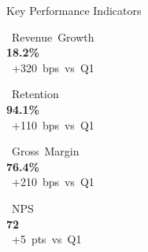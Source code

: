 \documentclass[11pt,aspectratio=169]{beamer}
\begin{document}
\begin{frame}{Key Performance Indicators}

  \vspace{0.15cm}

  \begin{minipage}[t]{0.235\textwidth}
    \begin{tcolorbox}[kpibox]
      \centering
      {\small\color{nxgray}\faDollarSign\ Revenue\ Growth}\\[0.2cm]
      {\fontsize{22}{28}\selectfont\bfseries\color{nxnavy}18.2\%}\\[0.05cm]
      {\tiny\color{nxteal}\faArrowUp\ +320\ bps\ vs\ Q1}
    \end{tcolorbox}
  \end{minipage}\hfill
  \begin{minipage}[t]{0.235\textwidth}
    \begin{tcolorbox}[kpibox]
      \centering
      {\small\color{nxgray}\faUsers\ Retention}\\[0.2cm]
      {\fontsize{22}{28}\selectfont\bfseries\color{nxnavy}94.1\%}\\[0.05cm]
      {\tiny\color{nxteal}\faArrowUp\ +110\ bps\ vs\ Q1}
    \end{tcolorbox}
  \end{minipage}\hfill
  \begin{minipage}[t]{0.235\textwidth}
    \begin{tcolorbox}[kpibox]
      \centering
      {\small\color{nxgray}\faChartBar\ Gross\ Margin}\\[0.2cm]
      {\fontsize{22}{28}\selectfont\bfseries\color{nxnavy}76.4\%}\\[0.05cm]
      {\tiny\color{nxteal}\faArrowUp\ +210\ bps\ vs\ Q1}
    \end{tcolorbox}
  \end{minipage}\hfill
  \begin{minipage}[t]{0.235\textwidth}
    \begin{tcolorbox}[kpibox]
      \centering
      {\small\color{nxgray}\faStar\ NPS}\\[0.2cm]
      {\fontsize{22}{28}\selectfont\bfseries\color{nxnavy}72}\\[0.05cm]
      {\tiny\color{nxteal}\faArrowUp\ +5\ pts\ vs\ Q1}
    \end{tcolorbox}
  \end{minipage}


\end{frame}
\end{document}
